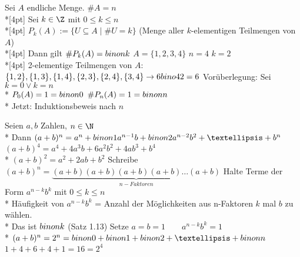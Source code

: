 Sei $A$ endliche Menge. $\#A=n$\\*[4pt]
Sei $k\in\Z$ mit $0\leq k\leq n$\\*[4pt]
$P_k(A):=\{U\subseteq A\mid \#U=k\}$ (Menge aller $k$-elementigen Teilmengen von $A$)\\*[4pt]
Dann gilt $\#P_k(A)=\\bino{n}{k}$
\bsp
$A=\{1,2,3,4\}$ $n=4$ $k=2$\\*[4pt]
2-elementige Teilmengen von $A$:
$\{1,2\}, \{1,3\}, \{1,4\}, \{2,3\}, \{2,4\}, \{3,4\} \to 6\qquad \\bino{4}{2}=6$ \ok
%
\bew
Vorüberlegung: Sei $k=0 \vee k=n$\\*
$P_0(A)=1=\\bino{n}{0}$ $\#P_n(A)=1=\\bino{n}{n}$\ok\\*
Jetzt: Induktionsbeweis nach $n$

Seien $a,b$ Zahlen, $n\in\N$\\*
Dann $(a+b)^n=a^n+\\bino{n}{1} a^{n-1} b+\\bino{n}{2}a^{n-2}b^2+…+b^n$
%
\bsp
$(a+b)^4=a^4+4a^3b+6a^2b^2+4ab^3+b^4$\\*
$(a+b)^2=a^2+2ab+b^2$
%
\bew
Schreibe $(a+b)^n=\underbrace{(a+b)(a+b)(a+b)(a+b)…(a+b)}_{n-Faktoren}$
%
Halte Terme der Form $a^{n-k}b^k$ mit $0\leq k\leq n$\\*
Häufigkeit von $a^{n-k}b^k$ = Anzahl der Möglichkeiten aus n-Faktoren $k$ mal $b$ zu wählen.\\*
Das ist $\\bino{n}{k}$ (Satz 1.13)
%
Setze $a=b=1\qquad a^{n-k}b^k=1$\\*
$(a+b)^n=2^n=\\bino{n}{0}+\\bino{n}{1}+\\bino{n}{2}+…+\\bino{n}{n}$
%
\bsp
$1+4+6+4+1=16=2^4$

